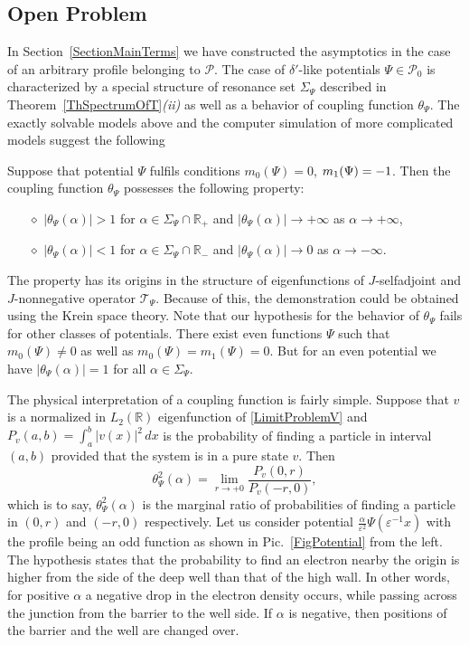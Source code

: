 \documentclass[11pt,english]{amsart}
\begin{document}
\subsection{Open Problem}

In Section~\ref{SectionMainTerms} we have constructed the asymptotics in the case of an arbitrary profile belonging to $\mathcal{P}$. The case of $\delta'$-like potentials $\Psi\in \mathcal{P}_0$ is characterized by a special structure of resonance set $\Sigma_\Psi$  described in Theorem~\ref{ThSpectrumOfT}\textit{(ii)} as well as a behavior of  coupling function $\theta_\Psi$. The exactly solvable models above and the computer simulation of more complicated models suggest the following
\begin{g_hyp} Suppose that potential $\Psi$ fulfils conditions $m_0(\Psi)=0$, $m_1(\Psi)\break=-1$.
Then the coupling function $\theta_\Psi$   possesses   the following property:
\begin{itemize}
  \item[$\diamond$] $|\theta_\Psi(\alpha)|>1$ for $\alpha\in \Sigma_\Psi\cap \mathbb R_+$ and $|\theta_\Psi(\alpha)|\to +\infty$ as $\alpha\to +\infty$,
  \item[$\diamond$] $|\theta_\Psi(\alpha)|<1$ for $\alpha\in \Sigma_\Psi\cap \mathbb R_-$ and $|\theta_\Psi(\alpha)|\to 0$ as $\alpha\to -\infty$.
\end{itemize}
\end{g_hyp}
The property has its origins in the structure of eigenfunctions of
$J$-selfadjoint and $J$-nonnegative operator $\mathcal{T}_\Psi$. Because of this, the demonstration could be obtained using the Krein space theory. Note that our hypothesis for the behavior of  $\theta_\Psi$  fails for other classes of potentials. There exist even functions $\Psi$ such that $m_0(\Psi)\neq 0$ as well as
$m_0(\Psi)=m_1(\Psi)=0$. But  for an even potential we have $|\theta_\Psi(\alpha)|=1$ for all $\alpha\in \Sigma_\Psi$.

The physical interpretation of a coupling function is fairly simple.
Suppose that $v$ is  a normalized in $L_2(\mathbb{R})$ eigenfunction of  \eqref{LimitProblemV} and
$P_v(a,b)=\int_a^b |v(x)|^2\,dx$ is the probability of finding a particle in  interval $(a,b)$ provided that the system is in a pure state $v$. Then
\begin{equation*}
    \theta_\Psi ^2(\alpha)=\lim\limits_{r\to +0}\frac{P_v(0,r)}{P_v(-r,0)},
\end{equation*}
which is to say,  $\theta_\Psi ^2(\alpha)$ is the marginal ratio of probabilities of finding a particle in
$(0,r)$ and $(-r, 0)$ respectively. Let us consider potential $\frac{\alpha}{\varepsilon^{2}}\Psi(\varepsilon^{-1}x)$ with the profile  being an odd function as shown in Pic.~\ref{FigPotential} from the left.
The hypothesis states that the probability to find an electron nearby the origin is higher from the side of the deep well than that of the high wall. In other words, for  positive $\alpha$ a negative drop in the electron density occurs, while passing across the junction from the barrier to the well side. If $\alpha$ is negative, then positions of the barrier and the well are changed over.
\end{document}

